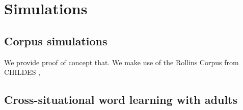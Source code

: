 \documentclass[man,noapacite,12pt]{apa2}
\newcommand{\vect}[1]{\accentset{\rightharpoonup}{#1}}
\begin{document}
 




%
%
%
%
%
%

\section{Simulations}


\subsection{Corpus simulations}

We provide proof of concept that.
We make use of the Rollins Corpus from CHILDES \cite{macwhinney2000}, 

\subsection{Cross-situational word learning with adults}
\end{document}
